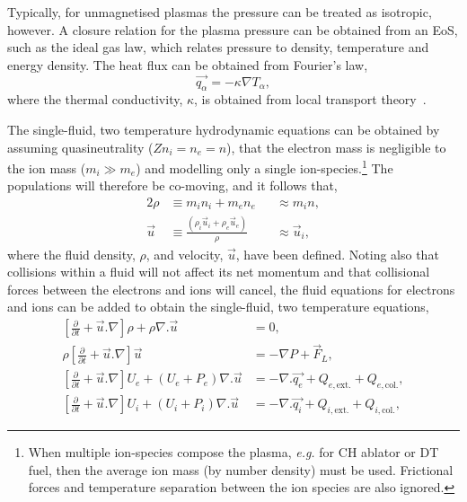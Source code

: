Typically, for unmagnetised plasmas the pressure can be treated as isotropic, however.
A closure relation for the plasma pressure can be obtained from an \ac{EoS}, such as the ideal gas law, which relates pressure to density, temperature and energy density.
The heat flux can be obtained from Fourier's law,
\begin{equation}
    \label{eq:theory_fourier_heat}
    \vec{q_\alpha} = -\kappa \nabla T_\alpha,
\end{equation}
where the thermal conductivity, $\kappa$, is obtained from local transport theory~\cite{braginskii_transport_1965,epperlein_plasma_1986}.

The single-fluid, two temperature hydrodynamic equations can be obtained by assuming quasineutrality ($Z n_i = n_e = n$), that the electron mass is negligible to the ion mass ($m_i \gg m_e$) and modelling only a single ion-species.\footnote{When multiple ion-species compose the plasma, \textit{e.g.} for CH ablator or DT fuel, then the average ion mass (by number density) must be used. Frictional forces and temperature separation between the ion species are also ignored.}
The populations will therefore be co-moving, and it follows that,
\begin{alignat}{2}
    \rho &\equiv m_i n_i + m_e n_e &&\approx m_i n,\\
    \vec{u} &\equiv \frac{(\rho_i \vec{u}_i + \rho_e \vec{u}_e)}{\rho} &&\approx \vec{u}_i,
\end{alignat}
where the fluid density, $\rho$, and velocity, $\vec{u}$, have been defined.
Noting also that collisions within a fluid will not affect its net momentum and that collisional forces between the electrons and ions will cancel, the fluid equations for electrons and ions can be added to obtain the single-fluid, two temperature equations,
\begin{align}
    \label{eq:theory_singlefluid_eqs_1}
    \left [ \frac{\partial}{\partial t} + \vec{u}.\nabla \right ] \rho + \rho\nabla . \vec{u} &= 0,\\
    \label{eq:theory_singlefluid_eqs_2}
    \rho \left [ \frac{\partial}{\partial t} + \vec{u}.\nabla \right ] \vec{u} &= -\nabla P + \vec{F}_{L},\\
    \label{eq:theory_singlefluid_eqs_3}
    \left [ \frac{\partial}{\partial t} + \vec{u}.\nabla \right ] U_e + (U_e + P_e)\nabla.\vec{u} &= -\nabla . \vec{q_e} + Q_{e,\text{ext.}} + Q_{e,\text{col.}},\\
    \label{eq:theory_singlefluid_eqs_4}
    \left [ \frac{\partial}{\partial t} + \vec{u}.\nabla \right ] U_i + (U_i + P_i)\nabla.\vec{u} &= -\nabla . \vec{q_i} + Q_{i,\text{ext.}} + Q_{i,\text{col.}},
\end{align}
